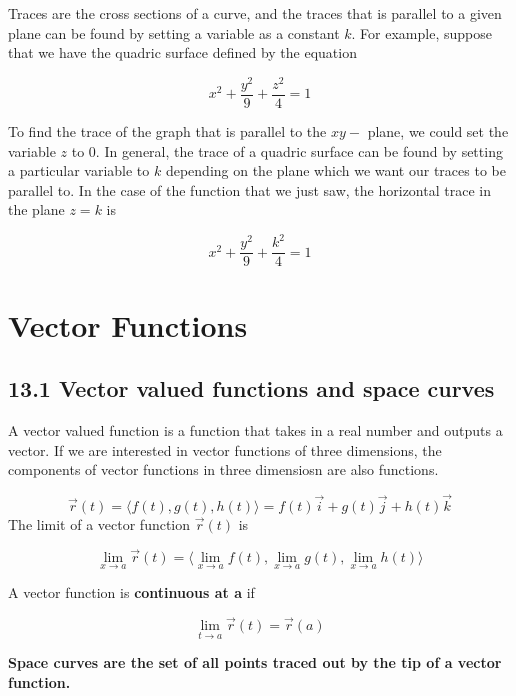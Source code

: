 \documentclass{article}
\begin{document}
	Traces are the cross sections of a curve, and the traces that is parallel to a
	given plane can be found by setting a variable as a constant $k$. For example,
	suppose that we have the quadric surface defined by the equation

	\[
		x^{2}+\frac{y^{2}}{9}+\frac{z^{2}}{4}= 1
	\]

	To find the trace of the graph that is parallel to the $xy-$ plane, we could
	set the variable $z$ to $0$. In general, the trace of a quadric surface can be
	found by setting a particular variable to $k$ depending on the plane which we
	want our traces to be parallel to. In the case of the function that we just saw,
	the horizontal trace in the plane $z=k$ is

	\[
		x^{2}+\frac{y^{2}}{9}+\frac{k^{2}}{4}= 1
	\]
	\pagebreak
	\section{Vector Functions}
	\subsection{13.1 Vector valued functions and space curves}

	A vector valued function is a function that takes in a real number and outputs
	a vector. If we are interested in vector functions of three dimensions, the
	components of vector functions in three dimensiosn are also functions.

	\[
		\vec{r}(t) = \langle f(t), g(t), h(t)\rangle = f(t)\vec{i}+g(t)\vec{j}+h(t)\vec
		{k}
	\]
	The limit of a vector function $\vec{r}(t)$ is

	\[
		\lim_{x \to a}\vec{r}(t) = \langle \lim_{x \to a}f(t), \lim_{x \to a}g(t), \lim
		_{x \to a}h(t) \rangle
	\]

	A vector function is \textbf{continuous at a} if

	\[
		\lim_{t \to a}\vec{r}(t) = \vec{r}(a)
	\]

	\textbf{Space curves are the set of all points traced out by the tip of a
	vector function.}
\end{document}
